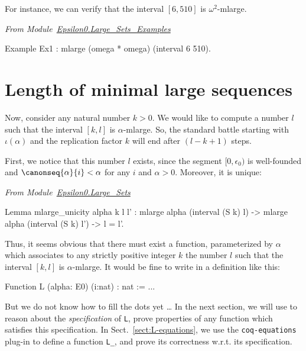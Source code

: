 For instance, we can verify that the interval $[6,510]$ is $\omega^2$-mlarge.

\vspace{4pt}
 \noindent
\emph{From Module~\href{../theories/html/hydras.Epsilon0.Large_Sets_Examples.html}{Epsilon0.Large\_Sets\_Examples}}
\begin{Coqsrc}
Example Ex1 : mlarge (omega * omega) (interval 6 510).
\end{Coqsrc}


\section{Length of minimal large sequences}

Now, consider any natural number $k>0$. We would like to compute
a number $l$ such that the interval $[k,l]$ is $\alpha$-mlarge. So, 
the standard battle starting with $\iota(\alpha)$ and the replication factor $k$ will end after $(l-k+1)$ steps.



First, we notice that this  number $l$ exists, since the segment $[0,\epsilon_0)$ is well-founded and $\canonseq{\alpha}{i}<\alpha$ for any $i$ and $\alpha>0$.
Moreover, it is unique:

\vspace{4pt}
\noindent
\emph{From Module~\href{../theories/html/hydras.Epsilon0.Large_Sets.html}{Epsilon0.Large\_Sets}}
\begin{Coqsrc}
Lemma mlarge_unicity alpha k l l' : 
  mlarge alpha (interval (S k) l) ->
  mlarge alpha (interval (S k) l') ->
  l = l'.
\end{Coqsrc}

Thus, it seems obvious that there must exist a function, parameterized by $\alpha$ which associates to any  strictly positive integer $k$ the number $l$ such that
the interval $[k,l]$ is $\alpha$-mlarge. It would be fine to write in \gallina{} a definition like this:

\begin{Coqbad}
Function L (alpha: E0) (i:nat) :  nat := ...
\end{Coqbad}

But we do not know how to fill the dots yet \dots{}   In the next section, we will 
use \coq{} to reason  about the \emph{specification} of \texttt{L},
prove properties of any function which satisfies this specification.
In Sect.~\ref{sect:L-equations}, we use the \texttt{coq-equations} plug-in
to define a function \texttt{L\_}, and prove its correctness w.r.t. its specification.


